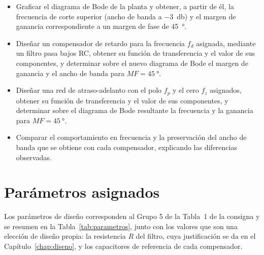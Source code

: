 \begin{itemize}
  \item Graficar el diagrama de Bode de la planta y obtener, a partir de él, la frecuencia de corte superior
        (ancho de banda a \qty{-3}{\decibel}) y el margen de ganancia correspondiente a un margen de fase de
        \qty{45}{\degree}.
  \item Diseñar un compensador de retardo para la frecuencia $f_d$ asignada, mediante un filtro pasa bajos RC,
        obtener su función de transferencia y el valor de sus componentes, y determinar sobre el nuevo diagrama
        de Bode el margen de ganancia y el ancho de banda para $MF = \qty{45}{\degree}$.
  \item Diseñar una red de atraso-adelanto con el polo $f_p$ y el cero $f_z$ asignados, obtener su función de
        transferencia y el valor de sus componentes, y determinar sobre el diagrama de Bode resultante la
        frecuencia y la ganancia para $MF = \qty{45}{\degree}$.
  \item Comparar el comportamiento en frecuencia y la preservación del ancho de banda que se obtiene con cada
        compensador, explicando las diferencias observadas.
\end{itemize}

\section{Parámetros asignados}

Los parámetros de diseño corresponden al Grupo 5 de la Tabla~1 de la consigna y se resumen en la
Tabla~\ref{tab:parametros}, junto con los valores que son una elección de diseño propia: la resistencia $R$
del filtro, cuya justificación se da en el Capítulo~\ref{chap:diseno}, y los capacitores de referencia de
cada compensador.

